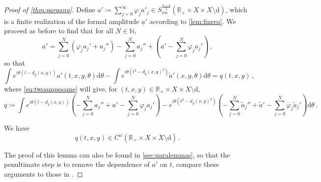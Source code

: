 \documentclass[
	fontsize=11pt, 
	twoside=false, 
	abstract=true, 
	a4paper,
]{scrartcl}
\newcommand{\RR}{\mathbb{R}}
\newcommand{\DD}{\mathscr{D}}
\newcommand{\dd}{\mathrm{d}}
\newcommand{\abs}[1]{\left\lvert#1\right\rvert}
\newcommand{\del}{\partial}
\newcommand{\td}[1]{\tilde{#1}}
\newcommand{\ud}[1]{\underline{#1}}
\begin{document}
\begin{proof}[Proof of \cref{thm:paraana}]
	Define $a' \coloneqq \sum_{j=0}^\infty \varphi_j a'_j \in S^{\frac{n-3}{2}}_{\psi a}(\RR_+\times X\times X\setminus\mathrm{d})$, which is a finite realization of the formal amplitude $\ud{a}'$ according to \cref{lem:finrea}. 
	We proceed as before to find that for all $N\in\mathbb{N}$,
	\[
		a' = \sum_{j=0}^N (\varphi_j a_j'+a_j'') - \sum_{j=0}^Na_j'' + \left(a' - \sum_{j=0}^N \varphi_j a_j'\right)\,,%
	\]
	so that 
	\begin{equation}\label{eq:diffisq}
		\int e^{i\theta(t-d_g(x,y))}a'(t,x,y,\theta)\dd\theta- \int e^{i\theta(t^2-d_g(x,y)^2)}\td{a}'(x,y,\theta)\dd\theta = q(t,x,y)\,,
	\end{equation}
	where \cref{eq:twoampssame} will give, for $(t,x,y)\in \RR_+\times X\times X\setminus \dd$,
	\begin{equation}\label{eq:deftdtdq}
		q \coloneqq \int e^{i\theta(t-d_g(x,y))}\left(-\sum_{j=0}^Na_j'' +a' - \sum_{j=0}^N \varphi_j a_j'\right) - e^{i\theta(t^2-d_g(x,y)^2)}\left(-\sum_{j=0}^N\td{a}_j'' +\td{a}' - \sum_{j=0}^N\varphi_j\td{a}_j'\right)\dd\theta\,.
	\end{equation}
	\begin{lemma}\label{lem:qananotd}
	We have
	\begin{equation*}%
		{q}(t,x,y) \in %
		C^\omega(\RR_+\times X\times X\setminus\mathrm{d})\,.
	\end{equation*}
	\end{lemma}
	The proof of this lemma can also be found in \cref{sec:paralemmas}, so that the penultimate step is to remove the dependence of $a'$ on $t$, compare these arguments to those in \cite[\S~21.1.2]{MR4436039}. %


\end{proof}
\end{document}
